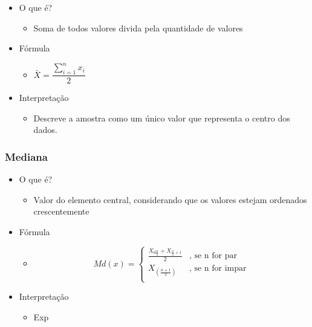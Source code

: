 \documentclass[
  letterpaper,
  DIV=11,
  numbers=noendperiod]{scrreprt}
\providecommand{\tightlist}{%
  \setlength{\itemsep}{0pt}\setlength{\parskip}{0pt}}\usepackage{longtable,booktabs,array}
\begin{document}
\begin{itemize}
\tightlist
\item
  O que é?

  \begin{itemize}
  \tightlist
  \item
    Soma de todos valores divida pela quantidade de valores
  \end{itemize}
\item
  Fórmula

  \begin{itemize}
  \tightlist
  \item
    \(\bar{X}=\dfrac{\sum^{n}_{i=1}x_i}{2}\)
  \end{itemize}
\item
  Interpretação

  \begin{itemize}
  \tightlist
  \item
    Descreve a amostra como um único valor que representa o centro dos
    dados.
  \end{itemize}
\end{itemize}

\hypertarget{mediana}{%
\subsubsection{Mediana}\label{mediana}}

\begin{itemize}
\tightlist
\item
  O que é?

  \begin{itemize}
  \tightlist
  \item
    Valor do elemento central, considerando que os valores estejam
    ordenados crescentemente
  \end{itemize}
\item
  Fórmula

  \begin{itemize}
  \tightlist
  \item
    \[
    Md(x) = \left\{\begin{matrix}
        \frac{X_{d\frac{n}{2}} + X_{\frac{n}{2}+1}}{2} & \text{, se n for par} \\
        X_{(\frac{n+1}{2})} & \text{, se n for impar} \\        
    \end{matrix}\right.
    \]
  \end{itemize}
\item
  Interpretação

  \begin{itemize}
  \tightlist
  \item
    Exp
  \end{itemize}
\end{itemize}
\end{document}
